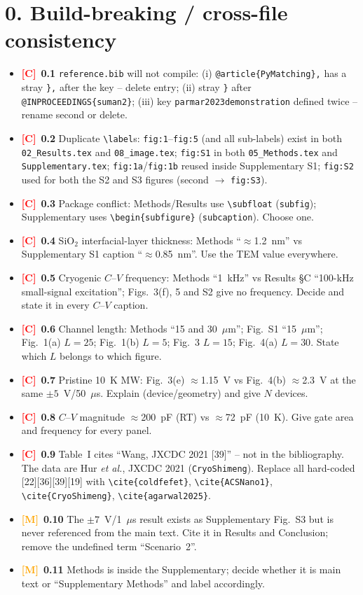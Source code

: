 \documentclass[10pt,a4paper]{article}
\newcommand{\C}{\textcolor{red}{\textbf{[C]}}}
\newcommand{\M}{\textcolor{orange}{\textbf{[M]}}}
\begin{document}
\section*{0. Build-breaking / cross-file consistency}
\begin{itemize}
\item \C\ \textbf{0.1} \texttt{reference.bib} will not compile: (i) \texttt{@article\{PyMatching\},} has a stray \texttt{\},} after the key -- delete entry; (ii) stray \texttt{\}} after \texttt{@INPROCEEDINGS\{suman2\}}; (iii) key \texttt{parmar2023demonstration} defined twice -- rename second or delete.
\item \C\ \textbf{0.2} Duplicate \verb|\label|s: \texttt{fig:1}--\texttt{fig:5} (and all sub-labels) exist in both \texttt{02\_Results.tex} and \texttt{08\_image.tex}; \texttt{fig:S1} in both \texttt{05\_Methods.tex} and \texttt{Supplementary.tex}; \texttt{fig:1a}/\texttt{fig:1b} reused inside Supplementary S1; \texttt{fig:S2} used for both the S2 and S3 figures (second $\rightarrow$ \texttt{fig:S3}).
\item \C\ \textbf{0.3} Package conflict: Methods/Results use \verb|\subfloat| (\texttt{subfig}); Supplementary uses \verb|\begin{subfigure}| (\texttt{subcaption}). Choose one.
\item \C\ \textbf{0.4} SiO$_2$ interfacial-layer thickness: Methods ``$\approx$1.2~nm'' vs Supplementary S1 caption ``$\approx$0.85~nm''. Use the TEM value everywhere.
\item \C\ \textbf{0.5} Cryogenic $C$--$V$ frequency: Methods ``1~kHz'' vs Results \S C ``100-kHz small-signal excitation''; Figs.~3(f), 5 and S2 give no frequency. Decide and state it in every $C$--$V$ caption.
\item \C\ \textbf{0.6} Channel length: Methods ``15 and 30~$\mu$m''; Fig.~S1 ``15~$\mu$m''; Fig.~1(a) $L=25$; Fig.~1(b) $L=5$; Fig.~3 $L=15$; Fig.~4(a) $L=30$. State which $L$ belongs to which figure.
\item \C\ \textbf{0.7} Pristine 10~K MW: Fig.~3(e) $\approx$1.15~V vs Fig.~4(b) $\approx$2.3~V at the same $\pm5$~V/50~$\mu$s. Explain (device/geometry) and give $N$ devices.
\item \C\ \textbf{0.8} $C$--$V$ magnitude $\approx$200~pF (RT) vs $\approx$72~pF (10~K). Give gate area and frequency for every panel.
\item \C\ \textbf{0.9} Table~I cites ``Wang, JXCDC 2021 [39]'' -- not in the bibliography. The data are Hur \emph{et al.}, JXCDC 2021 (\texttt{CryoShimeng}). Replace all hard-coded [22][36][39][19] with \verb|\cite{coldfefet}|, \verb|\cite{ACSNano1}|, \verb|\cite{CryoShimeng}|, \verb|\cite{agarwal2025}|.
\item \M\ \textbf{0.10} The $\pm7$~V/1~$\mu$s result exists as Supplementary Fig.~S3 but is never referenced from the main text. Cite it in Results and Conclusion; remove the undefined term ``Scenario~2''.
\item \M\ \textbf{0.11} Methods is \verb|| inside the Supplementary; decide whether it is main text or ``Supplementary Methods'' and label accordingly.
\end{itemize}
\end{document}
